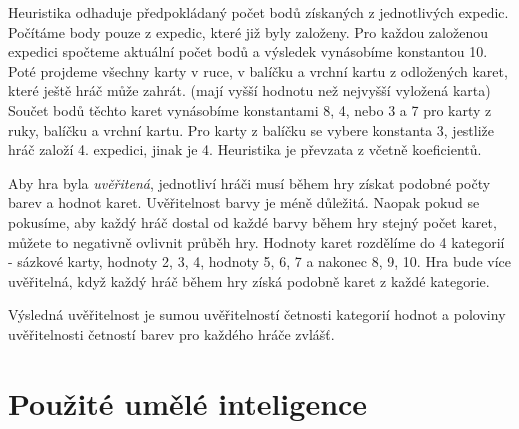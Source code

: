 Heuristika odhaduje předpokládaný počet bodů získaných z jednotlivých expedic. Počítáme body pouze z expedic, které již byly založeny. Pro každou založenou expedici spočteme aktuální počet bodů a výsledek vynásobíme konstantou 10. Poté projdeme všechny karty v ruce, v balíčku a vrchní kartu z odložených karet, které ještě hráč může zahrát. (mají vyšší hodnotu než nejvyšší vyložená karta) Součet bodů těchto karet vynásobíme konstantami 8, 4, nebo 3 a 7 pro karty z ruky, balíčku a vrchní kartu. Pro karty z balíčku se vybere konstanta 3, jestliže hráč založí 4. expedici, jinak je 4. Heuristika je převzata z \cite{Neni} včetně koeficientů.

Aby hra byla \emph{uvěřitená}, jednotliví hráči musí během hry získat podobné počty barev a hodnot karet. Uvěřitelnost barvy je méně důležitá. Naopak pokud se pokusíme, aby každý hráč dostal od každé barvy během hry stejný počet karet, můžete to negativně ovlivnit průběh hry. Hodnoty karet rozdělíme do 4 kategorií - sázkové karty, hodnoty 2, 3, 4, hodnoty 5, 6, 7 a nakonec 8, 9, 10. Hra bude více uvěřitelná, když každý hráč během hry získá podobně karet z každé kategorie.

Výsledná uvěřitelnost je sumou uvěřitelností četnosti kategorií hodnot a poloviny uvěřitelnosti četností barev pro každého hráče zvlášť.

\section{Použité umělé inteligence}

\endinput
